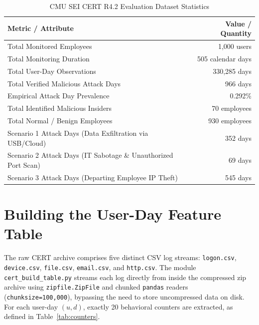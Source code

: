 \documentclass[12pt,a4paper]{report}
\begin{document}
\begin{table}[H]
\centering
\caption{CMU SEI CERT R4.2 Evaluation Dataset Statistics}
\label{tab:dataset_stats}
\begin{tabular}{lr}
\toprule
\textbf{Metric / Attribute} & \textbf{Value / Quantity} \\
\midrule
Total Monitored Employees & 1,000 users \\
Total Monitoring Duration & 505 calendar days \\
Total User-Day Observations & 330,285 days \\
Total Verified Malicious Attack Days & 966 days \\
Empirical Attack Day Prevalence & 0.292\% \\
Total Identified Malicious Insiders & 70 employees \\
Total Normal / Benign Employees & 930 employees \\
Scenario 1 Attack Days (Data Exfiltration via USB/Cloud) & 352 days \\
Scenario 2 Attack Days (IT Sabotage \& Unauthorized Port Scan) & 69 days \\
Scenario 3 Attack Days (Departing Employee IP Theft) & 545 days \\
\bottomrule
\end{tabular}
\end{table}

\section{Building the User-Day Feature Table}
The raw CERT archive comprises five distinct CSV log streams: \texttt{logon.csv}, \texttt{device.csv}, \texttt{file.csv}, \texttt{email.csv}, and \texttt{http.csv}. The module \texttt{cert\_build\_table.py} streams each log directly from inside the compressed zip archive using \texttt{zipfile.ZipFile} and chunked \texttt{pandas} readers (\texttt{chunksize=100,000}), bypassing the need to store uncompressed data on disk. For each user-day $(u, d)$, exactly 20 behavioral counters are extracted, as defined in Table~\ref{tab:counters}.
\end{document}
